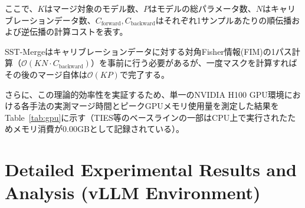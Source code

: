 \documentclass{article}
\begin{document}
ここで、$K$はマージ対象のモデル数、$P$はモデルの総パラメータ数、$N$はキャリブレーションデータ数、$C_{\text{forward}},C_{\text{backward}}$はそれぞれ1サンプルあたりの順伝播および逆伝播の計算コストを表す。

SST-Mergeはキャリブレーションデータに対する対角Fisher情報(FIM)の1パス計算（$\mathcal{O}(KN \cdot C_{\text{backward}})$）を事前に行う必要があるが、一度マスクを計算すればその後のマージ自体は$\mathcal{O}(KP)$で完了する。

さらに、この理論的効率性を実証するため、単一のNVIDIA H100 GPU環境における各手法の実測マージ時間とピークGPUメモリ使用量を測定した結果をTable~\ref{tab:gpu}に示す（TIES等のベースラインの一部はCPU上で実行されたためメモリ消費が0.00GBとして記録されている）。

\begin{table}[H]
\centering
\caption{各マージ手法の実測マージ時間とピークGPUメモリ(平均)}
\label{tab:gpu}
\small
{}
\end{table}





\appendix

\FloatBarrier
\section{Detailed Experimental Results and Analysis (vLLM Environment)}
\label{sec:appendix_detailed_results}
\end{document}
